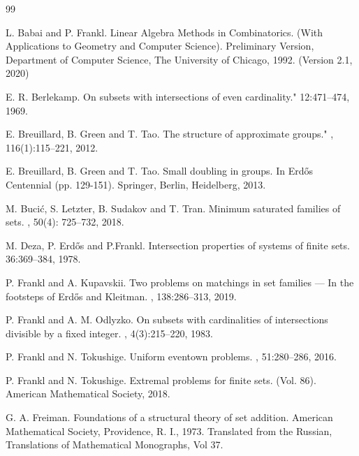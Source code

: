 \begin{thebibliography}{99}

L. Babai and P. Frankl.
\newblock Linear Algebra Methods in Combinatorics. (With Applications to Geometry and Computer Science).
\newblock Preliminary Version, Department of Computer Science, The University of Chicago, 1992. (Version 2.1, 2020)

E. R. Berlekamp.
\newblock On subsets with intersections of even cardinality."
 12:471--474, 1969. 

\newblock E. Breuillard, B. Green and T. Tao. 
\newblock The structure of approximate groups."
, 116(1):115--221, 2012.

E. Breuillard, B. Green and T. Tao.
\newblock Small doubling in groups.
\newblock In Erd\H{o}s Centennial (pp. 129-151). Springer, Berlin, Heidelberg, 2013. 

M. Buci\'{c}, S. Letzter, B. Sudakov and T. Tran. 
\newblock Minimum saturated families of sets. 
, 50(4): 725--732, 2018.

M. Deza, P. Erd\H{o}s and P.Frankl.
\newblock Intersection properties of systems of finite sets.
 36:369--384, 1978.

P. Frankl and A. Kupavskii. 
\newblock Two problems on matchings in set families --- In the footsteps of Erd\H{o}s and Kleitman. 
, 138:286--313, 2019. 

P. Frankl and A. M. Odlyzko. 
\newblock On subsets with cardinalities of intersections divisible by a fixed integer.
, 4(3):215--220, 1983.

P. Frankl and N. Tokushige.
\newblock Uniform eventown problems.
, 51:280--286, 2016.

P. Frankl and N. Tokushige.
\newblock Extremal problems for finite sets.
\newblock (Vol. 86). American Mathematical Society, 2018.

G. A. Freiman. 
\newblock Foundations of a structural theory of set addition. 
\newblock American Mathematical Society, Providence, R. I., 1973. Translated from the Russian, Translations of Mathematical Monographs, Vol 37.


\end{thebibliography}
